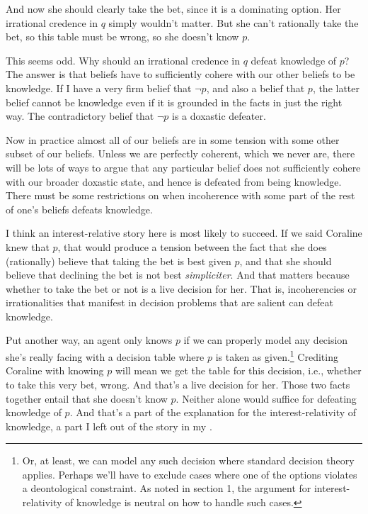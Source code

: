 {\noindent And now she should clearly take the bet, since it is a dominating option. Her irrational credence in $q$ simply wouldn't matter. But she can't rationally take the bet, so this table must be wrong, so she doesn't know $p$.

This seems odd. Why should an irrational credence in $q$ defeat knowledge of $p$? The answer is that beliefs have to sufficiently cohere with our other beliefs to be knowledge. If I have a very firm belief that $\neg p$, and also a belief that $p$, the latter belief cannot be knowledge even if it is grounded in the facts in just the right way. The contradictory belief that $\neg p$ is a doxastic defeater.

Now in practice almost all of our beliefs are in some tension with some other subset of our beliefs. Unless we are perfectly coherent, which we never are, there will be lots of ways to argue that any particular belief does not sufficiently cohere with our broader doxastic state, and hence is defeated from being knowledge. There must be some restrictions on when incoherence with some part of the rest of one's beliefs defeats knowledge.

I think an interest-relative story here is most likely to succeed. If we said Coraline knew that $p$, that would produce a tension between the fact that she does (rationally) believe that taking the bet is best given $p$, and that she should believe that declining the bet is not best \textit{simpliciter}. And that matters because whether to take the bet or not is a live decision for her. That is, incoherencies or irrationalities that manifest in decision problems that are salient can defeat knowledge.

Put another way, an agent only knows $p$ if we can properly model any decision she's really facing with a decision table where $p$ is taken as given.\footnote{Or, at least, we can model any such decision where standard decision theory applies. Perhaps we'll have to exclude cases where one of the options violates a deontological constraint. As noted in section 1, the argument for interest-relativity of knowledge is neutral on how to handle such cases.} Crediting Coraline with knowing $p$ will mean we get the table for this decision, i.e., whether to take this very bet, wrong. And that's a live decision for her. Those two facts together entail that she doesn't know $p$. Neither alone would suffice for defeating knowledge of $p$. And that's a part of the explanation for the interest-relativity of knowledge, a part I left out of the story in my \citeyearpar{Weatherson2005-WEACWD}.
}